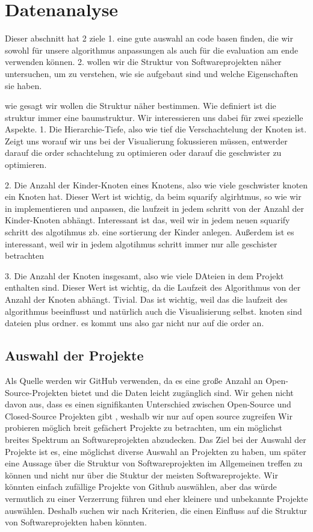 \chapter{Datenanalyse} \label{sec:datenAnalyse}
Dieser abschnitt hat 2 ziele 1. eine gute auswahl an code basen finden, die wir sowohl für unsere algorithmus anpassungen als auch für die evaluation am ende verwenden können.
2. wollen wir die Struktur von Softwareprojekten näher untersuchen, um zu verstehen, wie sie aufgebaut sind und welche Eigenschaften sie haben.

wie gesagt wir wollen die Struktur näher bestimmen. Wie definiert ist die struktur immer eine baumstruktur. 
Wir interessieren uns dabei für zwei spezielle Aspekte. 
1. Die Hierarchie-Tiefe, also wie tief die Verschachtelung der Knoten ist. 
Zeigt uns worauf wir uns bei der Visualierung fokussieren müssen, entwerder darauf die order schachtelung zu optimieren oder darauf die geschwister zu optimieren.

2. Die Anzahl der Kinder-Knoten eines Knotens, also wie viele geschwister knoten ein Knoten hat. Dieser Wert ist wichtig, da beim squarify algirhtmus, so wie wir in implementieren und anpassen, die laufzeit in jedem schritt von der Anzahl der Kinder-Knoten abhängt.
Interessant ist das, weil wir in jedem neuen squarify schritt des algotihmus zb. eine sortierung der Kinder anlegen. Außerdem ist es interessant, weil wir in jedem algotihmus schritt immer nur alle geschister betrachten

3. Die Anzahl der Knoten insgesamt, also wie viele DAteien in dem Projekt enthalten sind. Dieser Wert ist wichtig, da die Laufzeit des Algorithmus von der Anzahl der Knoten abhängt.
Tivial. Das ist wichtig, weil das die laufzeit des algorithmus beeinflusst und natürlich auch die Visualisierung selbst.
knoten sind dateien plus ordner. es kommt uns also gar nicht nur auf die order an.



\section{Auswahl der Projekte} \label{sec:auswahlDerProjekte}
Als Quelle werden wir GitHub verwenden, da es eine große Anzahl an Open-Source-Projekten bietet und die Daten leicht zugänglich sind.
Wir gehen nicht davon aus, dass es einen signifikanten Unterschied zwischen Open-Source und Closed-Source Projekten gibt \cite{closedVsOpenSource, closedVsOpenSource2}, weshalb wir nur auf open source zugreifen 
Wir probieren möglich breit gefächert Projekte zu betrachten, um ein möglichst breites Spektrum an Softwareprojekten abzudecken. 
Das Ziel bei der Auswahl der Projekte ist es, eine möglichst diverse Auswahl an Projekten zu haben, um später eine Aussage über die Struktur von Softwareprojekten im Allgemeinen treffen zu können und nicht nur über die Stuktur der meisten Softwareprojekte. Wir könnten einfach zufällige Projekte von Github auswählen, aber das würde vermutlich zu einer Verzerrung führen und eher kleinere und unbekannte Projekte auswählen.
Deshalb suchen wir nach Kriterien, die einen Einfluss auf die Struktur von Softwareprojekten haben könnten. 

